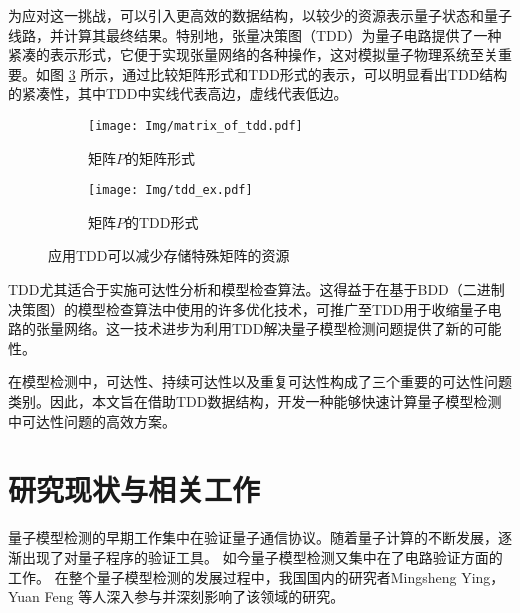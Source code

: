 为应对这一挑战，可以引入更高效的数据结构，以较少的资源表示量子状态和量子线路，并计算其最终结果。特别地，张量决策图（TDD）为量子电路提供了一种紧凑的表示形式，它便于实现张量网络的各种操作，这对模拟量子物理系统至关重要。如图 \ref{fig:P} 所示，通过比较矩阵形式和TDD形式的表示，可以明显看出TDD结构的紧凑性，其中TDD中实线代表高边，虚线代表低边。
 	 
\begin{figure}[!htbp]
    \begin{subfigure}[c]{0.4\textwidth}
        \centering
        \texttt{[image: Img/matrix\_of\_tdd.pdf]}
        \caption{矩阵$P$的矩阵形式}
        \label{fig:mat_P}
    \end{subfigure}
    \begin{subfigure}[c]{0.4\textwidth}
        \centering
        \texttt{[image: Img/tdd\_ex.pdf]}
        \caption{矩阵$P$的TDD形式}
        \label{fig:tdd_P}
    \end{subfigure}
    \caption{应用TDD可以减少存储特殊矩阵的资源}
    \label{fig:P}
\end{figure}

TDD尤其适合于实施可达性分析和模型检查算法。这得益于在基于BDD（二进制决策图）的模型检查算法中使用的许多优化技术，可推广至TDD用于收缩量子电路的张量网络\citep{Chaki_2018}。这一技术进步为利用TDD解决量子模型检测问题提供了新的可能性。

在模型检测中，可达性、持续可达性以及重复可达性构成了三个重要的可达性问题类别。因此，本文旨在借助TDD数据结构，开发一种能够快速计算量子模型检测中可达性问题的高效方案。

\section{研究现状与相关工作}
量子模型检测的早期工作集中在验证量子通信协议。随着量子计算的不断发展，逐渐出现了对量子程序的验证工具。
如今量子模型检测又集中在了电路验证方面的工作。
在整个量子模型检测的发展过程中，我国国内的研究者Mingsheng Ying， Yuan Feng 等人深入参与并深刻影响了该领域的研究。

